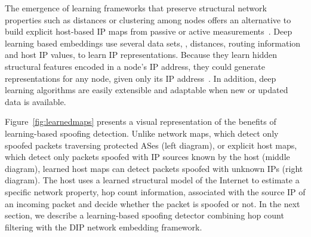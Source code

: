 The emergence of learning frameworks that preserve structural network properties such as distances or clustering among nodes offers an alternative to build explicit host-based IP maps from passive or active measurements~\citep{dip,net-emb}. 
%
Deep learning based embeddings use several data sets, \ie, distances, routing information and host IP values, to learn IP representations. Because they learn hidden structural features encoded in a node's IP address, they could generate representations for any node, given only its IP address~\citep{dip}. In addition, deep learning algorithms are easily extensible and adaptable when new or updated data is available. 

%
%

Figure~\ref{fig:learnedmaps} presents a visual representation of the benefits of learning-based spoofing detection. Unlike network maps, which detect only spoofed packets traversing protected ASes (left diagram), or explicit host maps, which detect only packets spoofed with IP sources known by the host (middle diagram), learned host maps can detect packets spoofed with unknown IPs (right diagram). The host uses a learned structural model of the Internet to estimate a specific network property, \eg{} hop count information, associated with the source IP of an incoming packet and decide whether the packet is spoofed or not. In the next section, we describe a learning-based spoofing detector combining hop count filtering with the DIP network embedding framework.


